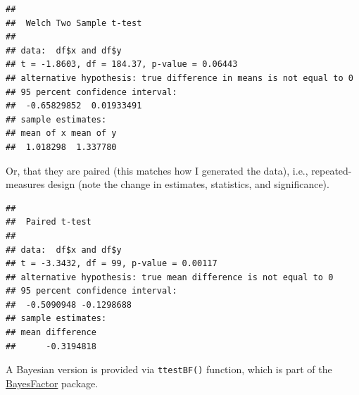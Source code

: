 \documentclass[
]{book}
\newenvironment{Shaded}{\begin{snugshade}}{\end{snugshade}}
\newcommand{\AttributeTok}[1]{\textcolor[rgb]{0.77,0.63,0.00}{#1}}
\newcommand{\ConstantTok}[1]{\textcolor[rgb]{0.00,0.00,0.00}{#1}}
\newcommand{\FunctionTok}[1]{\textcolor[rgb]{0.00,0.00,0.00}{#1}}
\newcommand{\NormalTok}[1]{#1}
\newcommand{\SpecialCharTok}[1]{\textcolor[rgb]{0.00,0.00,0.00}{#1}}
\begin{document}
\begin{Shaded}
\end{Shaded}

\begin{verbatim}
## 
##  Welch Two Sample t-test
## 
## data:  df$x and df$y
## t = -1.8603, df = 184.37, p-value = 0.06443
## alternative hypothesis: true difference in means is not equal to 0
## 95 percent confidence interval:
##  -0.65829852  0.01933491
## sample estimates:
## mean of x mean of y 
##  1.018298  1.337780
\end{verbatim}

Or, that they are paired (this matches how I generated the data), i.e., repeated-measures design (note the change in estimates, statistics, and significance).

\begin{Shaded}
\end{Shaded}

\begin{verbatim}
## 
##  Paired t-test
## 
## data:  df$x and df$y
## t = -3.3432, df = 99, p-value = 0.00117
## alternative hypothesis: true mean difference is not equal to 0
## 95 percent confidence interval:
##  -0.5090948 -0.1298688
## sample estimates:
## mean difference 
##      -0.3194818
\end{verbatim}

A Bayesian version is provided via \texttt{ttestBF()} function, which is part of the \href{https://richarddmorey.github.io/BayesFactor}{BayesFactor} package.

\begin{Shaded}
\end{Shaded}
\end{document}
